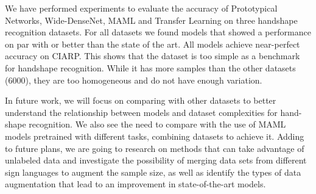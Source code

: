 We have performed experiments to evaluate the accuracy of Prototypical Networks, Wide-DenseNet, MAML and Transfer Learning on three handshape recognition datasets. For all datasets we found models that showed a performance on par with or better than the state of the art. All models achieve near-perfect accuracy on CIARP. This shows that the dataset is too simple as a benchmark for handshape recognition. While it has more samples than the other datasets (6000), they are too homogeneous and do not have enough variation.

In  future  work,  we  will  focus  on  comparing  with  other  datasets  to  better understand the relationship between models and dataset complexities for hand-shape  recognition.  We  also  see  the  need to  compare with the use of MAML models pretrained with different tasks, combining datasets to achieve it. Adding to future plans, we are going to research on methods that can take advantage of unlabeled data and investigate the possibility of merging data sets from different sign languages to augment the sample size, as well as identify the types of data augmentation that lead to an improvement in state-of-the-art models.
